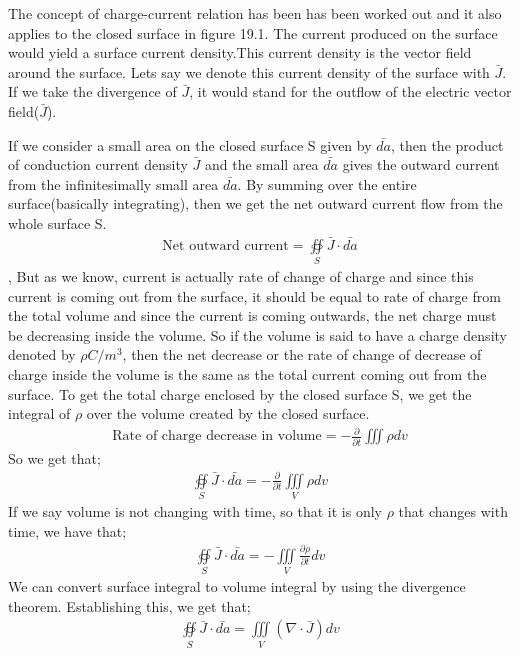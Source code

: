 The concept of charge-current relation has been has been worked out and it also applies to the closed surface in figure 19.1. The current produced on the surface would yield a surface current density.This current density is the vector field around the surface. Lets say we denote this current density of the surface with $\bar{J}$. If we take the divergence of $\bar{J}$, it would stand for the outflow of the electric vector field($\bar{J}$).

If we consider a small area on the closed surface S given by $\bar{da}$, then the product of conduction current density $\bar{J}$ and the small area  $\bar{da}$ gives the outward current from the infinitesimally small area  $\bar{da}$. By summing over the entire surface(basically integrating), then we get the net outward current flow from the whole surface S.
\begin{align*}
\text{Net outward current}= \oiint\limits_S\bar{J}\cdot\bar{da}
\end{align*},
But as we know, current is actually rate of change of charge and since this current is coming out from the surface, it should be equal to rate of charge from the total volume and since the current is coming outwards, the net charge must be decreasing inside the volume. So if the volume is said to have a charge density denoted by $\rho C/m^{3}$, then the net decrease or the rate of change of decrease of charge inside the volume is the same as the total current coming out from the surface.  To get the total charge enclosed by the closed surface S, we get the integral of $\rho$ over the volume created by the closed surface.
\begin{align*}
\text{Rate of charge decrease in volume}	= -\frac{\partial}{\partial t}\iiint \rho dv
\end{align*}
So we get that;
\begin{align*}
\oiint\limits_S\bar{J}\cdot\bar{da} =  -\frac{\partial}{\partial t}\iiint\limits_V\rho dv
\end{align*}
If we say volume is not changing with time, so that it is only $\rho$ that  changes with time, we have that;
\begin{align*}
\oiint\limits_S\bar{J}\cdot\bar{da} = -\iiint\limits_V\frac{\partial\rho}{\partial t}dv
\end{align*}
We can convert surface integral to volume integral by using the divergence theorem. Establishing this, we get that;
\begin{align*}
\oiint\limits_S\bar{J}\cdot\bar{da} = \iiint\limits_V(\nabla\cdot\bar{J})dv
\end{align*}
